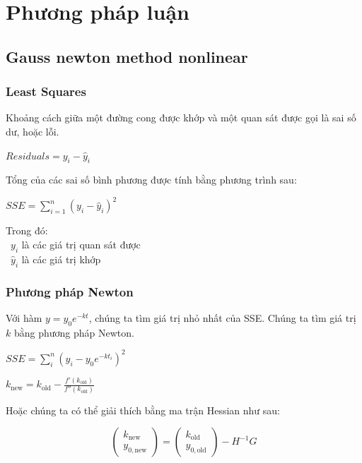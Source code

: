 \documentclass[conference]{IEEEtran}
\begin{document}
\section{Phương pháp luận}
\subsection{Gauss newton method nonlinear}
\subsubsection{Least Squares}
Khoảng cách giữa một đường cong được khớp và một quan sát được gọi là sai số dư, hoặc lỗi.

\begin{center}
    $Residuals = y_i - \widehat{y}_i$
\end{center}

Tổng của các sai số bình phương được tính bằng phương trình sau:

\begin{center}
    $SSE = \sum_{i=1}^{n}(y_i - \widehat{y}_i)^2$
\end{center}

Trong đó: \\
\indent\textbullet\ \(y_i\) là các giá trị quan sát được\\
\indent\textbullet\ \(\widehat{y}_i\) là các giá trị khớp\\

\subsubsection{Phương pháp Newton}
Với hàm \( y = y_0 e^{-kt} \), chúng ta tìm giá trị nhỏ nhất của SSE. Chúng ta tìm giá trị \(k\) bằng phương pháp Newton.

\begin{center}
    $SSE = \sum_{i}^{n}(y_i - y_0 e^{-kt_i})^2$
\end{center}

\begin{center}
    \(k_{\text{new}} = k_{\text{old}} - \frac{f'(k_{\text{old}})}{f''(k_{\text{old}})}\)
\end{center}

Hoặc chúng ta có thể giải thích bằng ma trận Hessian như sau:

\begin{center}
    \[
        \begin{pmatrix}
            k_{\text{new}} \\ y_{0,\text{new}}
        \end{pmatrix} =
        \begin{pmatrix}
            k_{\text{old}} \\ y_{0,\text{old}}
        \end{pmatrix} - H^{-1}G
    \]
\end{center}
\end{document}
